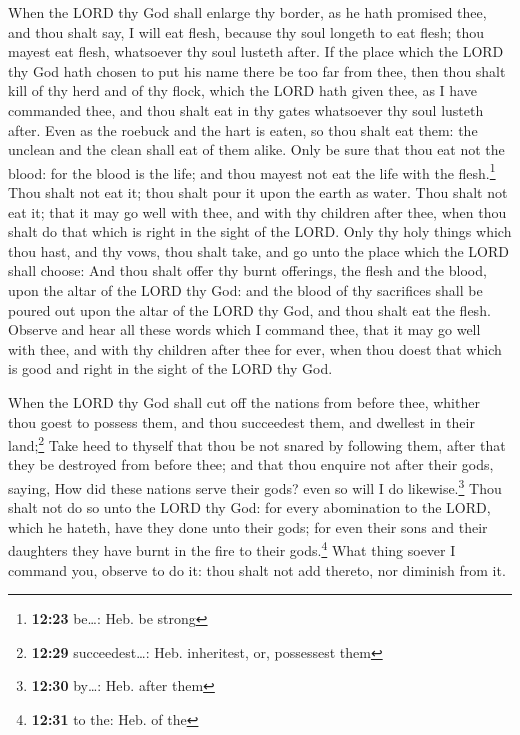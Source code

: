  When the LORD thy God shall enlarge thy border, as he
hath promised thee, and thou shalt say, I will eat flesh, because thy
soul longeth to eat flesh; thou mayest eat flesh, whatsoever thy soul
lusteth after.  If the place which the LORD thy God hath
chosen to put his name there be too far from thee, then thou shalt kill
of thy herd and of thy flock, which the LORD hath given thee, as I have
commanded thee, and thou shalt eat in thy gates whatsoever thy soul
lusteth after.  Even as the roebuck and the hart is
eaten, so thou shalt eat them: the unclean and the clean shall eat of
them alike.  Only be sure that thou eat not the blood:
for the blood is the life; and thou mayest not eat the life with the
flesh.\footnote{\textbf{12:23} be\ldots: Heb. be strong} 
Thou shalt not eat it; thou shalt pour it upon the earth as water.
 Thou shalt not eat it; that it may go well with thee,
and with thy children after thee, when thou shalt do that which is right
in the sight of the LORD.  Only thy holy things which
thou hast, and thy vows, thou shalt take, and go unto the place which
the LORD shall choose:  And thou shalt offer thy burnt
offerings, the flesh and the blood, upon the altar of the LORD thy God:
and the blood of thy sacrifices shall be poured out upon the altar of
the LORD thy God, and thou shalt eat the flesh.  Observe
and hear all these words which I command thee, that it may go well with
thee, and with thy children after thee for ever, when thou doest that
which is good and right in the sight of the LORD thy God.

 When the LORD thy God shall cut off the nations from
before thee, whither thou goest to possess them, and thou succeedest
them, and dwellest in their land;\footnote{\textbf{12:29}
  succeedest\ldots: Heb. inheritest, or, possessest them}
 Take heed to thyself that thou be not snared by
following them, after that they be destroyed from before thee; and that
thou enquire not after their gods, saying, How did these nations serve
their gods? even so will I do likewise.\footnote{\textbf{12:30}
  by\ldots: Heb. after them}  Thou shalt not do so unto
the LORD thy God: for every abomination to the LORD, which he hateth,
have they done unto their gods; for even their sons and their daughters
they have burnt in the fire to their gods.\footnote{\textbf{12:31} to
  the: Heb. of the}  What thing soever I command you,
observe to do it: thou shalt not add thereto, nor diminish from it.

